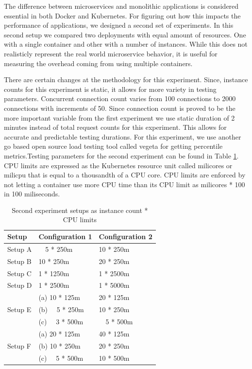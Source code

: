 \documentclass[12pt,oneandhalf,chaparabic,ceng,ms,eng,oneside,pntc]{gsufbe}
\begin{document}
The difference between microservices and monolithic applications is considered essential in both Docker
and Kubernetes. For figuring out how this impacts the performance of applications, we designed a second 
set of experiments. In this second setup we compared two deployments with equal amount of resources. One with
a single container and other with a number of instances. While this does not realisticly represent the
real world
microservice behavior, it is useful for measuring the overhead coming from using multiple containers.

There are certain changes at the methodology for this experiment. Since, instance counts for this experiment
is static, it allows for more variety in testing parameters. Concurrent connection count varies
from 100 connections to 2000 connections with increments of 50. Since connection count is proved to be the more
important variable from the first experiment we use static duration of 2 minutes instead of total request
counts for this experiment. This 
allows for accurate and predictable testing durations. For this experiment, we use another go based
open source load testing tool called vegeta for getting percentile metrics.Testing parameters for the second
experiment can be found in Table \ref{secondexp}. CPU limits are expressed as the Kubernetes resource unit
called milicores or milicpu that is equal to a thousandth of a CPU core. CPU limits are enforced by not
letting a container use more CPU time than its CPU limit as milicores * 100 in 100 miliseconds.

\begin{table}[h]
\caption{Second experiment setups as instance count * CPU limits}
\centering
\begin{tabular}{ |l|l|l| }
\hline
Setup & Configuration 1 & Configuration 2 \\ \hline
Setup A &  ~~5 *  250m & 10 *  250m \\
Setup B & 10 *  250m &  20 *  250m \\
Setup C &  1 * 1250m &   1 * 2500m \\
Setup D &  1 * 2500m &   1 * 5000m \\ \hline
\multirow{3}{*}{Setup E} 
 &(a) 10 *  125m & 20 *  125m \\
 &(b)  ~~5 *  250m & 10 *  250m \\
 &(c)  ~~3 *  500m & ~~5 *  500m \\ \hline
\multirow{3}{*}{Setup F}
 &(a) 20 *  125m & 40 *  125m \\
 &(b) 10 *  250m & 20 *  250m \\
 &(c)  ~~5 *  500m & 10 *  500m \\ \hline
\end{tabular}
\label{secondexp}
\end{table}
\end{document}
